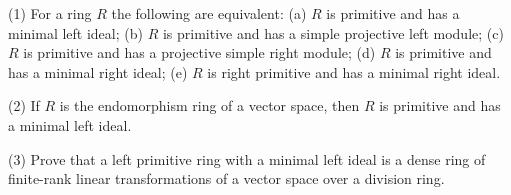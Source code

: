 (1) For a ring $R$ the following are equivalent:
(a) $R$ is primitive and has a minimal left ideal;
(b) $R$ is primitive and has a simple projective left module;
(c) $R$ is primitive and has a projective simple right module;
(d) $R$ is primitive and has a minimal right ideal;
(e) $R$ is right primitive and has a minimal right ideal.

(2) If $R$ is the endomorphism ring of a vector space, then $R$ is primitive and has a minimal left ideal.

(3) Prove that a left primitive ring with a minimal left ideal is a dense ring of finite-rank linear transformations of a vector space over a division ring.
